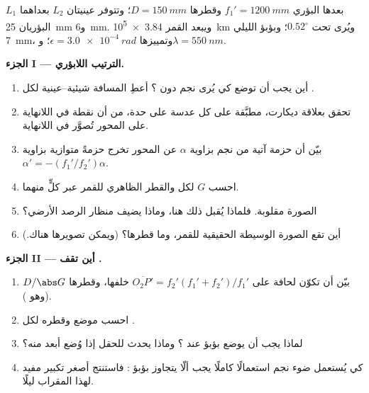 \begin{problem}
\label{pb:b1:optical-instruments:1}
  $L_1$ بعدها البؤري
$f_1' = \qty{1200}{mm}$ وقطرها $D = \qty{150}{mm}$؛ وتتوفر عينيتان
$L_2$ بعداهما البؤريان \qty{25}{mm} و\qty{6}{mm}. ويبعد
القمر \qty{3.84e5}{km} ويُرى تحت $0.52^\circ$؛ وبؤبؤ 
الليلي \qty{7}{mm}، وتمييزها $\epsilon = \qty{3.0e-4}{rad}$؛
و$\lambda = \qty{550}{nm}$.

\medskip
\noindent\textbf{الجزء I --- الترتيب اللابؤري.}
\begin{enumerate}
  \item أين يجب أن توضع  كي يُرى نجم دون
        ؟ أعطِ المسافة شيئية--عينية لكل
        .
  \item تحقق بعلاقة ديكارت، مطبَّقة على كل عدسة على حدة،
        من أن نقطة في اللانهاية على المحور تُصوَّر في اللانهاية.
  \item بيّن أن حزمة آتية من نجم بزاوية $\alpha$ عن المحور
        تخرج حزمةً متوازية بزاوية $\alpha' = -(f_1'/f_2')\alpha$.
  \item احسب $G$ لكل  والقطر الظاهري
        للقمر عبر كلٍّ منهما.
  \item الصورة مقلوبة. فلماذا يُقبل ذلك هنا، وماذا
        يضيف منظار الرصد الأرضي؟
  \item أين تقع الصورة الوسيطة الحقيقية للقمر، وما
        قطرها؟ (ويمكن تصويرها هناك.)
\end{enumerate}

\medskip
\noindent\textbf{الجزء II --- أين تقف .}
\begin{enumerate}[resume]
  \item بيّن أن  تكوّن  لحافة 
        على $\overline{O_2P'} = f_2'(f_1' + f_2')/f_1'$ خلفها، وقطرها
        $D/\abs G$ (وهو ).
  \item احسب موضع  وقطره لكل
        .
  \item لماذا يجب أن يوضع بؤبؤ  عند ؟ وماذا
        يحدث للحقل إذا وُضع أبعد منه؟
  \item كي يُستعمل ضوء نجم استعمالًا كاملًا يجب ألّا يتجاوز  بؤبؤ : فاستنتج أصغر تكبير مفيد
        لهذا المقراب ليلًا.
\end{enumerate}


\end{problem}
